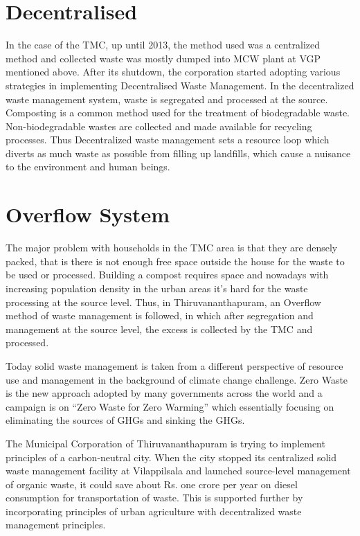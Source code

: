 \documentclass[12pt,a4paper]{report}
\begin{document}
\section{Decentralised}
\begin{justify}
	In the case of the TMC, up until 2013, the method used was a centralized method and collected waste was mostly dumped into MCW plant at VGP mentioned above. After its shutdown,  the corporation started adopting various strategies in implementing Decentralised Waste Management. In the decentralized waste management system, waste is segregated and processed at the source. Composting is a common method used for the treatment of biodegradable waste. Non-biodegradable wastes are collected and made available for recycling processes. Thus Decentralized waste management sets a resource loop which diverts as much waste as possible from filling up landfills, which cause a nuisance to the environment and human beings.
	
\end{justify}
\section{Overflow System}
\begin{justify}
	The major problem with households in the TMC area is that they are densely packed, that is there is not enough free space outside the house for the waste to be used or processed. Building a compost requires space and nowadays with increasing population density in the urban areas it's hard for the waste processing at the source level. Thus, in Thiruvananthapuram, an Overflow method of waste management is followed, in which after segregation and management at the source level, the excess is collected by the TMC and processed.
	
	Today solid waste management is taken from a different perspective of resource use and management in the background of climate change challenge. Zero Waste is the new approach adopted by many governments across the world and a campaign is on “Zero Waste for Zero Warming” which essentially focusing on eliminating the sources of GHGs and sinking the GHGs.
	
	The Municipal Corporation of Thiruvananthapuram is trying to implement principles of a carbon-neutral city. When the city stopped its centralized solid waste management facility at Vilappilsala and launched source-level management of organic waste, it could save about Rs. one crore per year on diesel consumption for transportation of waste. This is supported further by incorporating principles of urban agriculture with decentralized waste management principles.
	
\end{justify}
\end{document}

